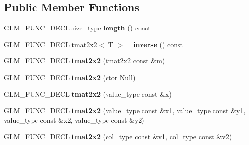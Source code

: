 \subsection*{\-Public \-Member \-Functions}
\begin{DoxyCompactItemize}
\item 
\hypertarget{structglm_1_1detail_1_1tmat2x2_abf87a187ad662c669872779ade1af02a}{\-G\-L\-M\-\_\-\-F\-U\-N\-C\-\_\-\-D\-E\-C\-L size\-\_\-type {\bfseries length} () const }\label{structglm_1_1detail_1_1tmat2x2_abf87a187ad662c669872779ade1af02a}

\item 
\hypertarget{structglm_1_1detail_1_1tmat2x2_a40d83f7f92111204f47b99d3416edc7f}{\-G\-L\-M\-\_\-\-F\-U\-N\-C\-\_\-\-D\-E\-C\-L \hyperlink{structglm_1_1detail_1_1tmat2x2}{tmat2x2}$<$ \-T $>$ {\bfseries \-\_\-inverse} () const }\label{structglm_1_1detail_1_1tmat2x2_a40d83f7f92111204f47b99d3416edc7f}

\item 
\hypertarget{structglm_1_1detail_1_1tmat2x2_a3af20d808ee9aa41d24998c5cc067bc0}{\-G\-L\-M\-\_\-\-F\-U\-N\-C\-\_\-\-D\-E\-C\-L {\bfseries tmat2x2} (\hyperlink{structglm_1_1detail_1_1tmat2x2}{tmat2x2} const \&m)}\label{structglm_1_1detail_1_1tmat2x2_a3af20d808ee9aa41d24998c5cc067bc0}

\item 
\hypertarget{structglm_1_1detail_1_1tmat2x2_a8f4070e1c3bfd05568b2dd2fddcaffae}{\-G\-L\-M\-\_\-\-F\-U\-N\-C\-\_\-\-D\-E\-C\-L {\bfseries tmat2x2} (ctor \-Null)}\label{structglm_1_1detail_1_1tmat2x2_a8f4070e1c3bfd05568b2dd2fddcaffae}

\item 
\hypertarget{structglm_1_1detail_1_1tmat2x2_a57f8c79a1f8df9214a4357b2b1952ff2}{\-G\-L\-M\-\_\-\-F\-U\-N\-C\-\_\-\-D\-E\-C\-L {\bfseries tmat2x2} (value\-\_\-type const \&x)}\label{structglm_1_1detail_1_1tmat2x2_a57f8c79a1f8df9214a4357b2b1952ff2}

\item 
\hypertarget{structglm_1_1detail_1_1tmat2x2_a846f370292295c373888c00dc63db0c3}{\-G\-L\-M\-\_\-\-F\-U\-N\-C\-\_\-\-D\-E\-C\-L {\bfseries tmat2x2} (value\-\_\-type const \&x1, value\-\_\-type const \&y1, value\-\_\-type const \&x2, value\-\_\-type const \&y2)}\label{structglm_1_1detail_1_1tmat2x2_a846f370292295c373888c00dc63db0c3}

\item 
\hypertarget{structglm_1_1detail_1_1tmat2x2_a3b1111723d77e85f6f836e6fec22d0d3}{\-G\-L\-M\-\_\-\-F\-U\-N\-C\-\_\-\-D\-E\-C\-L {\bfseries tmat2x2} (\hyperlink{structglm_1_1detail_1_1tvec2}{col\-\_\-type} const \&v1, \hyperlink{structglm_1_1detail_1_1tvec2}{col\-\_\-type} const \&v2)}\label{structglm_1_1detail_1_1tmat2x2_a3b1111723d77e85f6f836e6fec22d0d3}


\end{DoxyCompactItemize}
